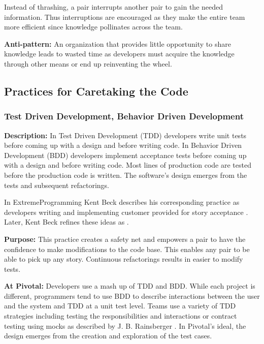 \begin{table}[]
Instead of thrashing, a pair interrupts another pair to gain the needed information. Thus interruptions are encouraged as they make the entire team more efficient since knowledge pollinates across the team. 

\textbf{Anti-pattern:} An organization that provides little opportunity to share knowledge leads to wasted time as developers must acquire the knowledge through other means or end up reinventing the wheel.
\subsection{Practices for Caretaking the Code}
\subsubsection{Test Driven Development, Behavior Driven Development}
\textbf{Description:} In Test Driven Development (TDD) developers write unit tests before coming up with a design and before writing code. In Behavior Driven Development (BDD) developers implement acceptance tests before coming up with a design and before writing code.  Most lines of production code are tested before the production code is written. The software's design emerges from the tests and subsequent refactorings.

In ExtremeProgramming Kent Beck describes his corresponding  practice as developers writing  and implementing customer provided  for story acceptance \cite{ExtremeProgramming2000}. Later, Kent Beck refines these ideas as  \cite{ExtremeProgramming2004}. 

\textbf{Purpose:} This practice creates a safety net and empowers a pair to have the confidence to make modifications to the code base. This enables any pair to be able to pick up any story. Continuous refactorings results in easier to modify tests.

\textbf{At Pivotal:} Developers use a mash up of TDD and BDD. While each project is different, programmers tend to use BDD to describe interactions between the user and the system and TDD at a unit test level. Teams use a variety of TDD strategies including testing the responsibilities and interactions \cite{Goose} or contract testing using mocks as described by J. B. Rainsberger \cite{RainsbergerIntegrationTestsYouTube}. In Pivotal's ideal, the design emerges from the creation and exploration of the test cases.  


\end{table}
